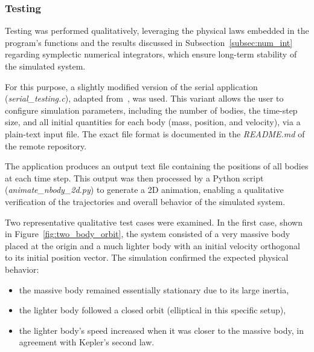 \documentclass{article}
\begin{document}
\subsubsection{Testing}
Testing was performed qualitatively, leveraging the physical laws embedded in the program’s functions and the results discussed in Subsection~\ref{subsec:num_int} regarding symplectic numerical integrators, which ensure long-term stability of the simulated system.

For this purpose, a slightly modified version of the serial application (\emph{serial\_testing.c}), adapted from~\cite{wiki:n_body}, was used. This variant allows the user to configure simulation parameters, including the number of bodies, the time-step size, and all initial quantities for each body (mass, position, and velocity), via a plain-text input file. The exact file format is documented in the \emph{README.md} of the remote repository.

The application produces an output text file containing the positions of all bodies at each time step. This output was then processed by a Python script (\emph{animate\_nbody\_2d.py}) to generate a 2D animation, enabling a qualitative verification of the trajectories and overall behavior of the simulated system.

Two representative qualitative test cases were examined.  
In the first case, shown in Figure~\ref{fig:two_body_orbit}, the system consisted of a very massive body placed at the origin and a much lighter body with an initial velocity orthogonal to its initial position vector.  
The simulation confirmed the expected physical behavior:  
\begin{itemize}
    \item the massive body remained essentially stationary due to its large inertia,
    \item the lighter body followed a closed orbit (elliptical in this specific setup),
    \item the lighter body’s speed increased when it was closer to the massive body, in agreement with Kepler's second law.
\end{itemize}
\end{document}
